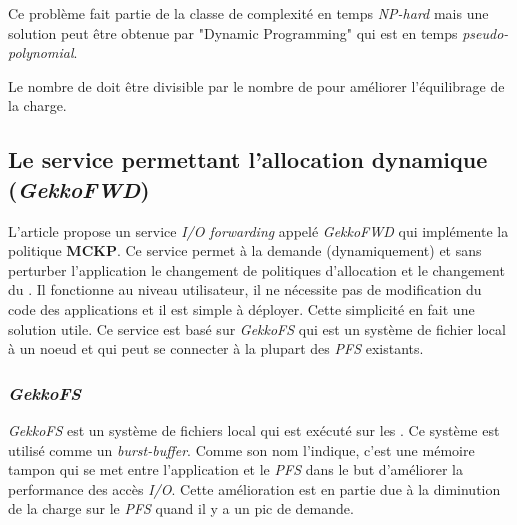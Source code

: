 \documentclass[10pt, a4paper]{article}
\begin{document}
Ce problème fait partie de la classe de complexité en temps \emph{NP-hard} mais une solution peut être obtenue par "Dynamic Programming" qui est en temps \emph{pseudo-polynomial}.

Le nombre de \noeudsDeCalculs{} doit être divisible par le nombre de \noeudsIOforwarding{} pour améliorer l'équilibrage de la charge.


\subsection{Le service permettant l'allocation dynamique (\emph{GekkoFWD})}

L'article propose un service \emph{I/O forwarding} appelé \emph{GekkoFWD} qui implémente la politique \textbf{MCKP}. Ce service permet à la demande (dynamiquement) et sans perturber l'application le changement de politiques d'allocation et le changement du \noeudsIOforwarding{}. Il fonctionne au niveau utilisateur, il ne nécessite pas de modification du code des applications et il est simple à déployer. Cette simplicité en fait une solution utile.
Ce service est basé sur \emph{GekkoFS} qui est un système de fichier local à un noeud et qui peut se connecter à la plupart des \emph{PFS} existants.

\subsubsection{\emph{GekkoFS}}

\emph{GekkoFS} est un système de fichiers local qui est exécuté sur les \noeudsDeCalculs{}. Ce système est utilisé comme un \emph{burst-buffer}. Comme son nom l'indique, c'est une mémoire tampon qui se met entre l'application et le \emph{PFS} dans le but d'améliorer la performance des accès \emph{I/O}. Cette amélioration est en partie due à la diminution de la charge sur le \emph{PFS} quand il y a un pic de demande.
\end{document}
